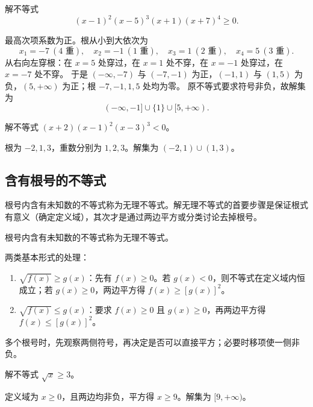 \begin{example}
  解不等式
  \[
  (x-1)^2(x-5)^3(x+1)(x+7)^4\ge 0.
  \]
\end{example}
\begin{jie}
  最高次项系数为正。根从小到大依次为
  \[
  x_1=-7\ (4\text{ 重}),\quad x_2=-1\ (1\text{ 重}),\quad x_3=1\ (2\text{ 重}),\quad x_4=5\ (3\text{ 重}).
  \]
  从右向左穿根：在 \(x=5\) 处穿过，在 \(x=1\) 处不穿，在 \(x=-1\) 处穿过，在 \(x=-7\) 处不穿。
  于是 \((-\infty,-7)\) 与 \((-7,-1)\) 为正，\((-1,1)\) 与 \((1,5)\) 为负，\((5,+\infty)\) 为正；根 \(-7,-1,1,5\) 处均为零。
  原不等式要求符号非负，故解集为
  \[
  (-\infty,-1]\cup\{1\}\cup[5,+\infty).
  \]
\end{jie}

\begin{exercise}
  解不等式 \((x+2)(x-1)^2(x-3)^3<0\)。
\end{exercise}
\begin{hint}
  根为 \(-2,1,3\)，重数分别为 \(1,2,3\)。解集为 \((-2,1)\cup(1,3)\)。
\end{hint}

\clearpage

\subsection{含有根号的不等式}
根号内含有未知数的不等式称为无理不等式。解无理不等式的首要步骤是保证根式有意义（确定定义域），其次才是通过两边平方或分类讨论去掉根号。
\begin{definition}[无理不等式]
  根号内含有未知数的不等式称为无理不等式。
\end{definition}
\begin{experience}
  两类基本形式的处理：
  \begin{enumerate}
    \item \(\sqrt{f(x)}\ge g(x)\)：先有 \(f(x)\ge 0\)。若 \(g(x)<0\)，则不等式在定义域内恒成立；若 \(g(x)\ge 0\)，两边平方得 \(f(x)\ge [g(x)]^2\)。
    \item \(\sqrt{f(x)}\le g(x)\)：要求 \(f(x)\ge 0\) 且 \(g(x)\ge 0\)，再两边平方得 \(f(x)\le [g(x)]^2\)。
  \end{enumerate}
  多个根号时，先观察两侧符号，再决定是否可以直接平方；必要时移项使一侧非负。
\end{experience}

\begin{example}
  解不等式 \(\sqrt{x}\ge 3\)。
\end{example}
\begin{jie}
  定义域为 \(x\ge 0\)，且两边均非负，平方得 \(x\ge 9\)。解集为 \([9,+\infty)\)。
\end{jie}

